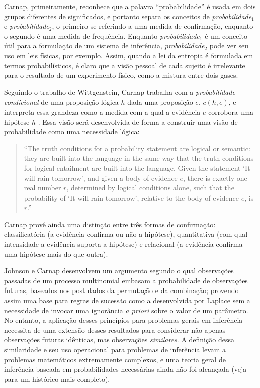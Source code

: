 Carnap, primeiramente, reconhece que a palavra ``probabilidade'' é usada em
dois grupos diferentes de significados, e 
portanto separa os conceitos de {\em probabilidade$_1$} e {\em probabilidade$_2$}, o primeiro
se referindo a uma medida de confirmação, enquanto o segundo é uma medida de frequência. Enquanto {\em probabilidade$_1$} é
um conceito útil para a formulação de um sistema de inferência, {\em probabilidade$_2$} pode ver seu uso em leis físicas, por
exemplo. Assim, quando a lei da entropia é formulada em termos probabilísticos, é claro que a visão pessoal de cada sujeito
é irrelevante para o resultado de um experimento físico, como a mistura entre dois gases. 

Seguindo o trabalho de Wittgenstein, Carnap trabalha 
com a {\em probabilidade condicional} de uma proposição lógica $h$ dada uma proposição $e$, $c(h, e)$, 
e interpreta essa grandeza como a medida com a qual a evidência $e$ corrobora uma hipótese $h$ \citep{Zabell09}.
Essa visão será desenvolvida de forma a construir uma visão de probabilidade como uma necessidade lógica:

\begin{quote}
``The truth conditions for a probability statement are logical or semantic: they are built into the language in the same
way that the truth conditions for logical entailment are built into the language. Given the statement `It will rain tomorrow',
and given a body of evidence $e$, there is exactly one real number $r$, determined by logical conditions alone, such
that the probability of `It will rain tomorrow', relative to the body of evidence $e$, is $r$.'' \citep{Kyburg74}
\end{quote}

Carnap provê ainda uma distinção entre três formas de confirmação: classificatória (a evidência confirma ou não a hipótese),
quantitativa (com qual intensidade a evidência suporta a hipótese) e relacional (a evidência confirma uma hipótese mais do que
outra)\citep{Carnap62}. 

Johnson e Carnap desenvolvem um argumento segundo o qual observações passadas de um processo multinomial embasam a probabilidade
de observações futuras, baseados nos postulados da permutação e da combinação; 
provendo assim uma base para regras de sucessão como a 
desenvolvida por Laplace sem a necessidade de invocar uma ignorância {\em a priori} sobre o valor de um parâmetro. 
No entanto, a aplicação desses princípios para problemas gerais em inferência necessita de uma extensão desses resultados
para considerar não apenas observações futuras idênticas, mas observações {\em similares}. A definição dessa similaridade
e seu uso operacional para problemas de inferência levam a problemas matemáticos extremamente complexos, e uma teoria
geral de inferência baseada em probabilidades necessárias ainda não foi alcançada (veja \cite{Zabell09} para um histórico
mais completo).

